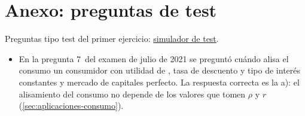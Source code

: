 \documentclass[11pt]{article}
\begin{document}
\section{Anexo: preguntas de test}\label{anexo:test}

\begin{anotaciones}
Preguntas tipo test del primer ejercicio: \href{https://www.victorgutierrezmarcos.es/oposicion/temario/primer-ejercicio/test/simulador.html?tema=3.A.29}{simulador de test}.
\end{anotaciones}

\begin{itemize}
\item En la pregunta 7~del examen de julio de 2021 se preguntó cuándo alisa el consumo un consumidor con utilidad de , tasa de descuento y tipo de interés constantes y mercado de capitales perfecto. La respuesta correcta es la a): el alisamiento del consumo no depende de los valores que tomen $\rho$ y $r$ (\ref{sec:aplicaciones-consumo}).
\end{itemize}

\bibliografia
\end{document}
